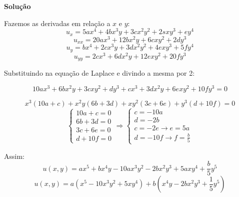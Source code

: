 \linespread{1.5}

\textbf{Solução}

Fazemos as derivadas em relação a $x$ e $y$:
\begin{equation*}
    u_x = 5ax^4 + 4bx^3y + 3cx^2y^2 + 2sxy^3 + ey^4
\end{equation*}
\begin{equation*}
    u_{xx} = 20ax^3 + 12bx^2y + 6cxy^2 + 2dy^3
\end{equation*}
\begin{equation*}
    u_y = bx^4 + 2cx^3y + 3dx^2y^2 + 4exy^3 + 5fy^4
\end{equation*}
\begin{equation*}
    u_{yy} = 2cx^3 + 6dx^2y + 12exy^2 + 20fy^3
\end{equation*}

Substituindo na equação de Laplace e divindo a mesma por 2:

\begin{equation*}
    10ax^3 + 6bx^2y + 3cxy^2 + dy^3 + cx^3 + 3dx^2y + 6exy^2 + 10fy^3 = 0
\end{equation*}

\begin{equation*}
    x^3(10a+c) + x^2y(6b+3d) + xy^2(3c+6e) + y^3(d+10f) = 0
\end{equation*}
\begin{equation*}
    \begin{cases}
    10a+c = 0\\
    6b+3d = 0\\
    3c+6e = 0\\
    d + 10f = 0
    \end{cases}
    \Rightarrow \begin{cases}
    \boxed{c = -10a}\\
    \boxed{d = -2b} \\
    c = -2e \rightarrow \boxed{e = 5a}\\
    d = -10f \rightarrow \boxed{f = \frac{b}{5}}
    \end{cases}
\end{equation*}

Assim:
\begin{equation*}
    u(x,y) = ax^5 + bx^4y -10ax^3y^2 - 2bx^2y^3 + 5axy^4 + \frac{b}{5}y^5
\end{equation*}
\begin{equation*}
    \boxed{u(x, y) = a(x^5 - 10x^3y^2 + 5xy^4) + b\left(x^4y - 2bx^2y^3 + \frac{1}{5}y^5\right)}
\end{equation*}
